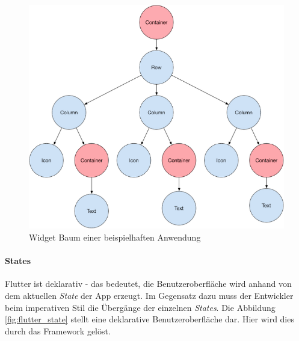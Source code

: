 \begin{figure}[tbt]
	\begin{center}
		\includegraphics[scale=0.5]{Theoretische_Grundlagen/images/flutter_widget_tree.png}
	\end{center}
	\caption[Widget Baum einer beispielhaften Anwendung]{Widget Baum einer beispielhaften Anwendung \protect \footnotemark}
	\label{fig:flutter_widget_tree}
\end{figure}
	

\paragraph{States}
Flutter ist deklarativ - das bedeutet, die Benutzeroberfläche wird anhand von dem aktuellen \textit{State} der App erzeugt. 
Im Gegensatz dazu muss der Entwickler beim imperativen Stil die Übergänge der einzelnen \textit{States}. 
Die Abbildung \ref{fig:flutter_state} stellt eine deklarative Benutzeroberfläche dar. 
Hier wird dies durch das Framework gelöst. 
	

